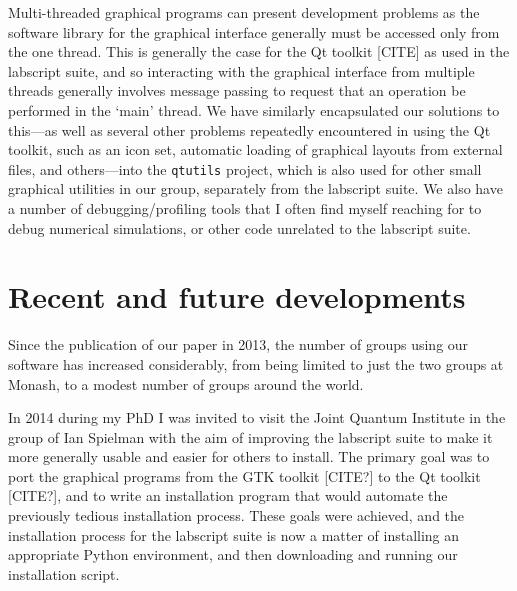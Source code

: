 Multi-threaded graphical programs can present development problems as the software library for the graphical interface generally must be accessed only from the one thread. This is generally the case for the Qt toolkit [CITE] as used in the labscript suite, and so interacting with the graphical interface from multiple threads generally involves message passing to request that an operation be performed in the `main' thread. We have similarly encapsulated our solutions to this---as well as several other problems repeatedly encountered in using the Qt toolkit, such as an icon set, automatic loading of graphical layouts from external files, and others---into the \texttt{qtutils} project, which is also used for other small graphical utilities in our group, separately from the labscript suite. We also have a number of debugging/profiling tools that I often find myself reaching for to debug numerical simulations, or other code unrelated to the labscript suite.


\section{Recent and future developments}

Since the publication of our paper in 2013, the number of groups using our software has increased considerably, from being limited to just the two groups at Monash, to a modest number of groups around the world.

In 2014 during my PhD I was invited to visit the Joint Quantum Institute in the group of Ian Spielman with the aim of improving the labscript suite to make it more generally usable and easier for others to install. The primary goal was to port the graphical programs from the GTK toolkit [CITE?] to the Qt toolkit [CITE?], and to write an installation program that would automate the previously tedious installation process. These goals were achieved, and the installation process for the labscript suite is now a matter of installing an appropriate Python environment, and then downloading and running our installation script.

